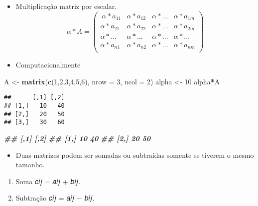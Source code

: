 \documentclass[
]{article}
\newenvironment{Shaded}{\begin{snugshade}}{\end{snugshade}}
\newcommand{\AttributeTok}[1]{\textcolor[rgb]{0.13,0.29,0.53}{#1}}
\newcommand{\DecValTok}[1]{\textcolor[rgb]{0.00,0.00,0.81}{#1}}
\newcommand{\DocumentationTok}[1]{\textcolor[rgb]{0.56,0.35,0.01}{\textbf{\textit{#1}}}}
\newcommand{\FunctionTok}[1]{\textcolor[rgb]{0.13,0.29,0.53}{\textbf{#1}}}
\newcommand{\NormalTok}[1]{#1}
\newcommand{\OtherTok}[1]{\textcolor[rgb]{0.56,0.35,0.01}{#1}}
\newcommand{\SpecialCharTok}[1]{\textcolor[rgb]{0.81,0.36,0.00}{\textbf{#1}}}
\providecommand{\tightlist}{%
  \setlength{\itemsep}{0pt}\setlength{\parskip}{0pt}}
\begin{document}
\begin{itemize}
\item
  Multiplicação matriz por escalar. \[\alpha * A = \begin{pmatrix}\
  \alpha * a_{11} & \alpha * a_{12} & \alpha * ... & \alpha * a_{1m}\\
  \alpha * a_{21} & \alpha * a_{22} & \alpha * ... & \alpha * a_{2m}\\
  \alpha * ... & \alpha * ... & \alpha * ... & \alpha * ... \\
  \alpha * a_{n1} & \alpha * a_{n2} & \alpha * ... & \alpha * a_{nm}\\
  \end{pmatrix}\]
\item
  Computacionalmente
\end{itemize}

\begin{Shaded}
\begin{Highlighting}[]
\NormalTok{A }\OtherTok{\textless{}{-}} \FunctionTok{matrix}\NormalTok{(}\FunctionTok{c}\NormalTok{(}\DecValTok{1}\NormalTok{,}\DecValTok{2}\NormalTok{,}\DecValTok{3}\NormalTok{,}\DecValTok{4}\NormalTok{,}\DecValTok{5}\NormalTok{,}\DecValTok{6}\NormalTok{),}
\AttributeTok{nrow =} \DecValTok{3}\NormalTok{, }\AttributeTok{ncol =} \DecValTok{2}\NormalTok{)}
\NormalTok{alpha }\OtherTok{\textless{}{-}} \DecValTok{10}
\NormalTok{alpha}\SpecialCharTok{*}\NormalTok{A}
\end{Highlighting}
\end{Shaded}

\begin{verbatim}
##      [,1] [,2]
## [1,]   10   40
## [2,]   20   50
## [3,]   30   60
\end{verbatim}

\begin{Shaded}
\begin{Highlighting}[]
\DocumentationTok{\#\# [,1] [,2]}
\DocumentationTok{\#\# [1,] 10 40}
\DocumentationTok{\#\# [2,] 20 50}
\end{Highlighting}
\end{Shaded}

\begin{itemize}
\tightlist
\item
  Duas matrizes podem ser somadas ou subtraídas somente se tiverem o
  mesmo tamanho.
\end{itemize}

\begin{enumerate}
\def\labelenumi{\arabic{enumi}.}
\tightlist
\item
  Soma 𝑐𝑖𝑗 = 𝑎𝑖𝑗 + 𝑏𝑖𝑗.
\item
  Subtração 𝑐𝑖𝑗 = 𝑎𝑖𝑗 − 𝑏𝑖𝑗.
\end{enumerate}
\end{document}
